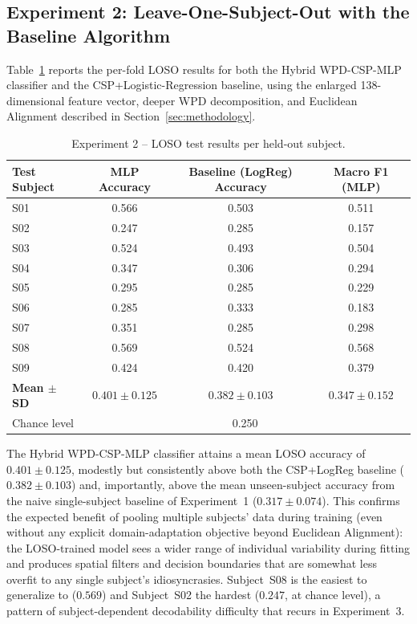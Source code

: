 \documentclass[11pt,a4paper]{article}
\begin{document}
\subsection{Experiment 2: Leave-One-Subject-Out with the Baseline Algorithm}
\label{sec:results-exp2}

Table~\ref{tab:exp2-loso} reports the per-fold LOSO results for both the Hybrid WPD-CSP-MLP classifier
and the CSP+Logistic-Regression baseline, using the enlarged 138-dimensional feature vector, deeper
WPD decomposition, and Euclidean Alignment described in Section~\ref{sec:methodology}.

\begin{table}[H]
\centering
\caption{Experiment 2 -- LOSO test results per held-out subject.}
\label{tab:exp2-loso}
\begin{tabular}{lccc}
\toprule
\textbf{Test Subject} & \textbf{MLP Accuracy} & \textbf{Baseline (LogReg) Accuracy} & \textbf{Macro F1 (MLP)} \\
\midrule
S01 & 0.566 & 0.503 & 0.511 \\
S02 & 0.247 & 0.285 & 0.157 \\
S03 & 0.524 & 0.493 & 0.504 \\
S04 & 0.347 & 0.306 & 0.294 \\
S05 & 0.295 & 0.285 & 0.229 \\
S06 & 0.285 & 0.333 & 0.183 \\
S07 & 0.351 & 0.285 & 0.298 \\
S08 & 0.569 & 0.524 & 0.568 \\
S09 & 0.424 & 0.420 & 0.379 \\
\midrule
\textbf{Mean $\pm$ SD} & $\mathbf{0.401 \pm 0.125}$ & $0.382 \pm 0.103$ & $0.347 \pm 0.152$ \\
Chance level & \multicolumn{3}{c}{0.250} \\
\bottomrule
\end{tabular}
\end{table}

\noindent The Hybrid WPD-CSP-MLP classifier attains a mean LOSO accuracy of $0.401 \pm 0.125$, modestly
but consistently above both the CSP+LogReg baseline ($0.382 \pm 0.103$) and, importantly, above the
mean unseen-subject accuracy from the naive single-subject baseline of Experiment~1 ($0.317 \pm
0.074$). This confirms the expected benefit of pooling multiple subjects' data during training (even
without any explicit domain-adaptation objective beyond Euclidean Alignment): the LOSO-trained model
sees a wider range of individual variability during fitting and produces spatial filters and decision
boundaries that are somewhat less overfit to any single subject's idiosyncrasies. Subject~S08 is the
easiest to generalize to ($0.569$) and Subject~S02 the hardest ($0.247$, at chance level), a pattern
of subject-dependent decodability difficulty that recurs in Experiment~3.
\end{document}
